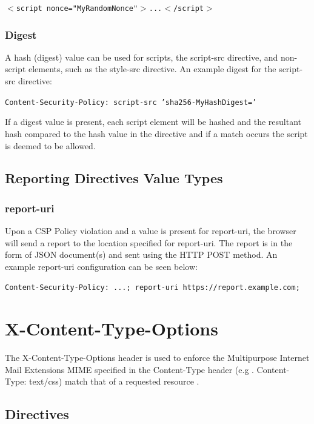 \documentclass{mscreport}
\begin{document}
\vspace{0.3cm}
\noindent
\texttt{$<$script nonce="MyRandomNonce"$>$...$<$/script$>$}


\subsubsection{Digest}

A hash (digest) value can be used for scripts, the script-src directive, and non-script elements, such as the style-src directive. An example digest for the script-src directive:

\vspace{0.3cm}
\noindent
\texttt{Content-Security-Policy: script-src 'sha256-MyHashDigest='}

\vspace{0.3cm}
\noindent
If a digest value is present, each script element will be hashed and the resultant hash compared to the hash value in the directive and if a match occurs the script is deemed to be allowed.

\subsection{Reporting Directives Value Types}

\subsubsection{report-uri}
Upon a CSP Policy violation and a value is present for report-uri, the browser will send a report to the location specified for report-uri. The report is in the form of JSON document(s) and sent using the HTTP POST method. An example report-uri configuration can be seen below:

\vspace{0.3cm}
\noindent
\texttt{Content-Security-Policy: ...; report-uri https://report.example.com;}

\newpage

\section{X-Content-Type-Options}

The X-Content-Type-Options header is used to enforce the Multipurpose Internet Mail Extensions MIME specified in the Content-Type header (e.g . Content-Type: text/css) match that of a requested resource \cite{Apple_undated-hz}.
\subsection{Directives}
\end{document}
